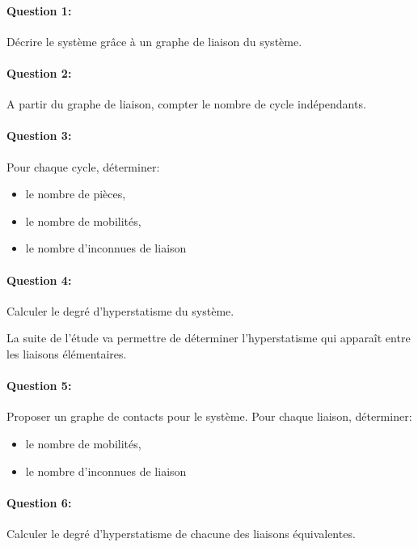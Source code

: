 

\ifdef{\public}{\cleardoublepage}{}



\paragraph{Question 1:} Décrire le système grâce à un graphe de liaison du système.

\paragraph{Question 2:} A partir du graphe de liaison, compter le nombre de cycle indépendants.

\paragraph{Question 3:} Pour chaque cycle, déterminer: 
 \begin{itemize}
  \item le nombre de pièces,
  \item le nombre de mobilités,
  \item le nombre d'inconnues de liaison
\end{itemize}

\paragraph{Question 4:} Calculer le degré d'hyperstatisme du système.

La suite de l'étude va permettre de déterminer l'hyperstatisme qui apparaît entre les liaisons élémentaires.

\paragraph{Question 5:} Proposer un graphe de contacts pour le système. Pour chaque liaison, déterminer: 
 \begin{itemize}
  \item le nombre de mobilités,
  \item le nombre d'inconnues de liaison
\end{itemize}

\paragraph{Question 6:} Calculer le degré d'hyperstatisme de chacune des liaisons équivalentes.

